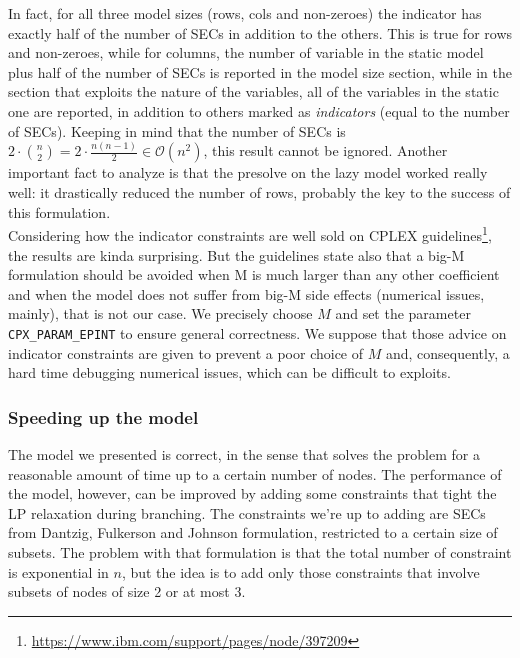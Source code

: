 In fact, for all three model sizes (rows, cols and non-zeroes) the indicator has
exactly half of the number of SECs in addition to the others. This is true for
rows and non-zeroes, while for columns, the number of variable in the static model
plus half of the number of SECs is reported in the model size section, while in
the section that exploits the nature of the variables, all of the variables in
the static one are reported, in addition to others marked as \emph{indicators}
(equal to the number of SECs). Keeping in mind that the number of SECs is $2 \cdot
{ n \choose 2} = 2 \cdot \frac{n (n - 1)}{2} \in \mathcal{O}(n^2)$, this result
cannot be ignored. Another important fact to analyze is that the presolve on the
lazy model worked really well: it drastically reduced the number of rows,
probably the key to the success of this formulation.\\

Considering how the indicator constraints are well sold on CPLEX
guidelines\footnote{\href{https://www.ibm.com/support/pages/node/397209}{https://www.ibm.com/support/pages/node/397209}},
the results are kinda surprising. But the guidelines state also that a big-M
formulation should be avoided when M is much larger than any other coefficient
and when the model does not suffer from big-M side effects (numerical issues,
mainly), that is not our case. We precisely choose $M$ and set the
parameter \texttt{CPX\_PARAM\_EPINT} to ensure general correctness. We suppose
that those advice on indicator constraints are given to prevent a poor choice
of $M$ and, consequently, a hard time debugging numerical issues, which can be
difficult to exploits.

\subsubsection{Speeding up the model}
The model we presented is correct, in the sense that solves the problem for a
reasonable amount of time up to a certain number of nodes. The performance of
the model, however, can be improved by adding some constraints that tight the LP
relaxation during branching. The constraints we're up to adding are SECs from
Dantzig, Fulkerson and Johnson formulation, restricted to a certain size of
subsets. The problem with that formulation is that the total number of
constraint is exponential in $n$, but the idea is to add only those constraints
that involve subsets of nodes of size 2 or at most 3.\\

